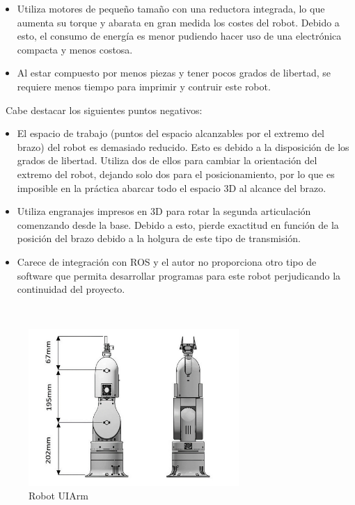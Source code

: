 \begin{itemize}
\begin{itemize}
        \item Utiliza motores de pequeño tamaño con una reductora integrada, lo que aumenta su torque y abarata en gran medida los costes 
        del robot. Debido a esto, el consumo de energía es menor pudiendo hacer uso de una electrónica compacta y menos costosa.
        \item Al estar compuesto por menos piezas y tener pocos grados de libertad, se requiere menos tiempo para imprimir y contruir este robot.
    \end{itemize}\
    Cabe destacar los siguientes puntos negativos:
    \begin{itemize}
        \item El espacio de trabajo (puntos del espacio alcanzables por el extremo del brazo) del robot es demasiado reducido. Esto es debido 
        a la disposición de los grados de libertad. Utiliza dos de ellos para cambiar la orientación del extremo del robot, dejando solo dos para el 
        posicionamiento, por lo que es imposible en la práctica abarcar todo el espacio 3D al alcance del brazo.
        \item Utiliza engranajes impresos en 3D para rotar la segunda articulación comenzando desde la base. Debido a esto, pierde exactitud en función 
        de la posición del brazo debido a la holgura de este tipo de transmisión.
        \item Carece de integración con \ac{ROS} y el autor no proporciona otro tipo de software que permita desarrollar programas para este robot perjudicando la 
        continuidad del proyecto.
    \end{itemize}\
    \begin{figure} [h!]
        \begin{center}
          \includegraphics[width=8cm]{figs/uiarm.png}
        \end{center}
        \caption{Robot UIArm}
        \label{fig:uiarm}
    \end{figure}\ 

\end{itemize}
